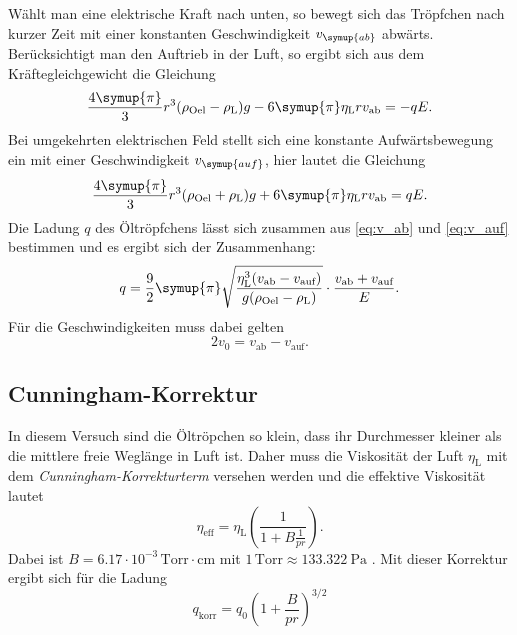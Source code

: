 Wählt man eine elektrische Kraft nach unten, so bewegt sich das Tröpfchen nach kurzer Zeit mit einer konstanten
Geschwindigkeit $v_{\symup{ab}}$ abwärts. Berücksichtigt man den Auftrieb in der Luft, so ergibt sich
aus dem Kräftegleichgewicht die Gleichung
\begin{equation}
    \label{eq:v_ab}
    \frac{4\symup{\pi}}{3}r^3(\rho_\text{Oel}-\rho_\text{L})g - 6\symup{\pi}\eta_\text{L}rv_{\text{ab}} = -qE.
\end{equation}
Bei umgekehrten elektrischen Feld stellt sich eine konstante Aufwärtsbewegung ein mit einer Geschwindigkeit $v_{\symup{auf}}$,
hier lautet die Gleichung
\begin{equation}
    \label{eq:v_auf}
    \frac{4\symup{\pi}}{3}r^3(\rho_\text{Oel}+\rho_\text{L})g + 6\symup{\pi}\eta_\text{L}rv_{\text{ab}} = qE.
\end{equation}
Die Ladung $q$ des Öltröpfchens lässt sich zusammen aus \eqref{eq:v_ab} und \eqref{eq:v_auf}
bestimmen und es ergibt sich der Zusammenhang:
\begin{equation}
    \label{eq:Ladung}
    q = \frac{9}{2} \symup{\pi} \sqrt{\frac{\eta_\text{L}^3(v_\text{ab} - v_\text{auf})}{g(\rho_\text{Oel}- \rho_\text{L})}} \cdot \frac{v_\text{ab} + v_\text{auf}}{E}.
\end{equation}
Für die Geschwindigkeiten muss dabei gelten
\begin{equation}
    \label{eq:Geschwindigkeiten}
    2v_0 = v_\text{ab} - v_\text{auf}.
\end{equation}

\subsection{Cunningham-Korrektur}
In diesem Versuch sind die Öltröpchen so klein, dass ihr Durchmesser kleiner als die mittlere freie Weglänge
in Luft ist. Daher muss die Viskosität der Luft $\eta_{\text{L}}$ mit dem
\textit{Cunningham-Korrekturterm} versehen werden und die effektive Viskosität lautet
\begin{equation*}
    \eta_\text{eff} = \eta_\text{L} \left(\frac{1}{1 + B \frac{1}{pr}}\right).
\end{equation*}
Dabei ist $B=6.17\cdot10^{-3}\,\text{Torr}\cdot\text{cm}$ \cite{v503} mit $1\,\text{Torr}\approx\qty{133.322}{\pascal}$ \cite{Torr}.
Mit dieser Korrektur ergibt sich für die Ladung
\begin{equation}
\label{eqn:q_korrigiert}
    q_\text{korr} = q_0 \left(1+ \frac{B}{pr}\right)^{3/2}
\end{equation}